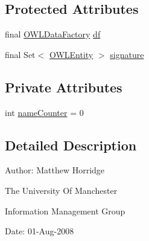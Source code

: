 \subsection*{Protected Attributes}
\begin{DoxyCompactItemize}
\item 
final \hyperlink{interfaceorg_1_1semanticweb_1_1owlapi_1_1model_1_1_o_w_l_data_factory}{O\-W\-L\-Data\-Factory} \hyperlink{classorg_1_1semanticweb_1_1owlapi_1_1util_1_1_structural_transformation_a3d86f23c382a3c4125e62c74fa286c43}{df}
\item 
final Set$<$ \hyperlink{interfaceorg_1_1semanticweb_1_1owlapi_1_1model_1_1_o_w_l_entity}{O\-W\-L\-Entity} $>$ \hyperlink{classorg_1_1semanticweb_1_1owlapi_1_1util_1_1_structural_transformation_a3acd3e6af970829727c4e68c1db41a85}{signature}
\end{DoxyCompactItemize}
\subsection*{Private Attributes}
\begin{DoxyCompactItemize}
\item 
int \hyperlink{classorg_1_1semanticweb_1_1owlapi_1_1util_1_1_structural_transformation_a8726b11de7ac2b14664148a7cfa38678}{name\-Counter} = 0
\end{DoxyCompactItemize}


\subsection{Detailed Description}
Author\-: Matthew Horridge\par
 The University Of Manchester\par
 Information Management Group\par
 Date\-: 01-\/\-Aug-\/2008\par
 \par
 

